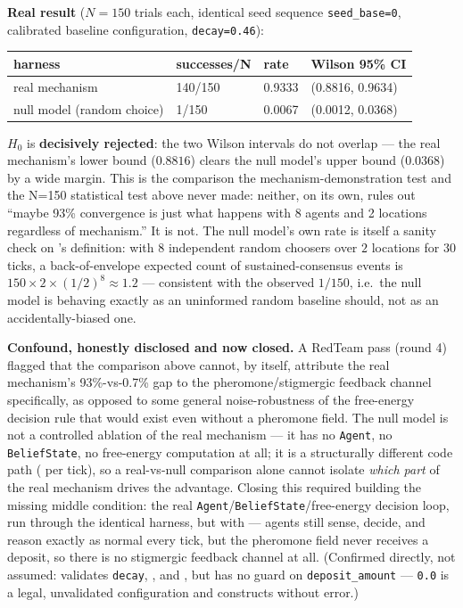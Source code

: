 \documentclass[
  english,
]{article}
\newcounter{none} %
\theoremstyle{definition}
\begin{document}
\textbf{Real result} (\(N=150\) trials each, identical seed sequence
\texttt{seed\_base=0}, calibrated baseline configuration,
\texttt{decay=0.46}):

{\def\LTcaptype{none} %
\begin{longtable}[]{@{}llll@{}}
\toprule\noalign{}
harness & successes/N & rate & Wilson 95\% CI \\
\midrule\noalign{}
\endhead
\bottomrule\noalign{}
\endlastfoot
real mechanism & 140/150 & 0.9333 & (0.8816, 0.9634) \\
null model (random choice) & 1/150 & 0.0067 & (0.0012, 0.0368) \\
\end{longtable}
}

\(H_0\) is \textbf{decisively rejected}: the two Wilson intervals do not
overlap --- the real mechanism's lower bound (\(0.8816\)) clears the
null model's upper bound (\(0.0368\)) by a wide margin. This is the
comparison the mechanism-demonstration test and the N=150 statistical
test above never made: neither, on its own, rules out ``maybe 93\%
convergence is just what happens with 8 agents and 2 locations
regardless of mechanism.'' It is not. The null model's own rate is
itself a sanity check on 's
definition: with \(8\) independent random choosers over \(2\) locations
for \(30\) ticks, a back-of-envelope expected count of
sustained-consensus events is
\(150 \times 2 \times (1/2)^8 \approx 1.2\) --- consistent with the
observed \(1/150\), i.e.~the null model is behaving exactly as an
uninformed random baseline should, not as an accidentally-biased one.

\textbf{Confound, honestly disclosed and now closed.} A RedTeam pass
(round 4) flagged that the comparison above cannot, by itself, attribute
the real mechanism's 93\%-vs-0.7\% gap to the pheromone/stigmergic
feedback channel specifically, as opposed to some general
noise-robustness of the free-energy decision rule that would exist even
without a pheromone field. The null model is not a controlled ablation
of the real mechanism --- it has no \texttt{Agent}, no
\texttt{BeliefState}, no free-energy computation at all; it is a
structurally different code path
( per tick), so a
real-vs-null comparison alone cannot isolate \emph{which part} of the
real mechanism drives the advantage. Closing this required building the
missing middle condition: the real
\texttt{Agent}/\texttt{BeliefState}/free-energy decision loop, run
through the identical  harness, but with
 --- agents still sense, decide, and reason
exactly as normal every tick, but the pheromone field never receives a
deposit, so there is no stigmergic feedback channel at all. (Confirmed
directly, not assumed: 
validates \texttt{decay}, , and
, but has no guard on
\texttt{deposit\_amount} --- \texttt{0.0} is a legal, unvalidated
configuration and constructs without error.)
\end{document}
